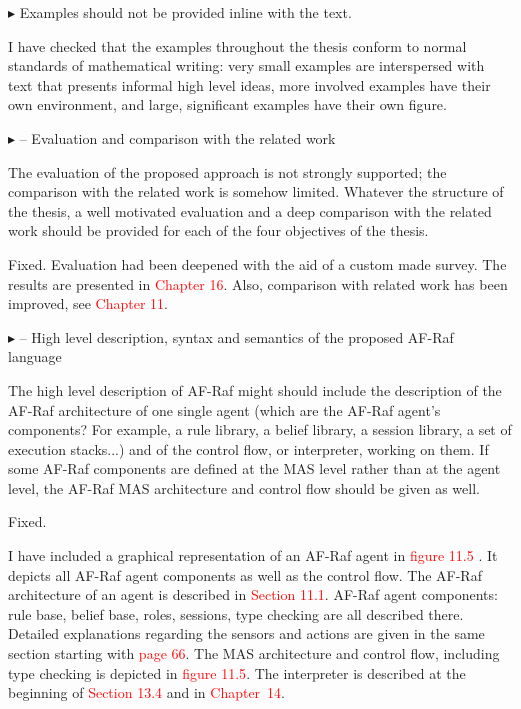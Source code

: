 \documentclass{article}
\newcommand*\R[1]{\textcolor{red}{#1}} %
\newenvironment{them}%
  {\bigskip\noindent\begingroup\color{blue}$\blacktriangleright$\enspace}%
  {\endgroup\par}
\begin{document}
\begin{them}
Examples should not be provided inline with the text.
\end{them}

I have checked that the examples throughout the thesis conform to normal
standards of mathematical writing: very small examples are interspersed with
text that presents informal high level ideas, more involved examples have their
own environment, and large, significant examples have their own figure.

\begin{them}
-- Evaluation and comparison with the related work

The evaluation of the proposed approach is not strongly supported; the
comparison with the related work is somehow limited. Whatever the structure of
the thesis, a well motivated evaluation and a deep comparison with the related
work should be provided for each of the four objectives of the thesis.
\end{them}
Fixed. Evaluation had been deepened with the aid of a custom made survey. The
results are presented in \R{Chapter 16}. Also, comparison with related work has
been improved, see \R{Chapter 11}.

\begin{them}
-- High level description, syntax and semantics of the proposed AF-Raf language

The high level description of AF-Raf might should include the description of
the AF-Raf architecture of one single agent (which are the AF-Raf agent's
components? For example, a rule library, a belief library, a session library, a
set of execution stacks...) and of the control flow, or interpreter, working on
them. If some AF-Raf components are defined at the MAS level rather than at the
agent level, the AF-Raf MAS architecture and control flow should be given as
well.
\end{them}
Fixed.

I have included a graphical representation of an AF-Raf agent in \R{figure 11.5
}. It depicts all AF-Raf agent components as well as the control flow. The
AF-Raf architecture of an agent is described in \R{Section 11.1}. AF-Raf agent
components: rule base, belief base, roles, sessions, type checking are all
described there. Detailed explanations regarding the sensors and actions are
given in the same section starting with \R{page 66}. The MAS architecture and
control flow, including type checking is depicted in \R{figure 11.5}. The
interpreter is described at the beginning of \R{Section 13.4} and in
\R{Chapter~14}.
\end{document}
